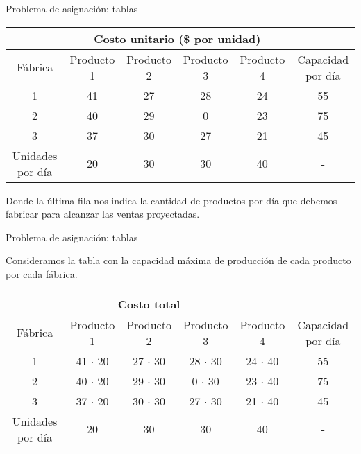 \documentclass{beamer}
\begin{document}
\begin{frame}[fragile]{Problema de asignación: tablas}
  \begin{center}
    \begin{adjustbox}{width = 1.05 \textwidth}
        \begin{tabular}{|c |c | c | c| c| c|}
          \hline
          & \multicolumn{4}{|c|}{ Costo unitario (\$ por unidad)}  &  \\
          \hline
          Fábrica & Producto 1 & Producto 2 & Producto 3 & Producto 4 &  Capacidad por día \\
          \hline 
          1 & 41 & 27 & 28 & 24 & 55 \\
          2 & 40 & 29 & 0 & 23  & 75 \\
          3 & 37 & 30 & 27 & 21 & 45 \\
          \hline 
          Unidades por día & 20 & 30 & 30 & 40 & - \\
          \hline
        \end{tabular}
    \end{adjustbox}
  \end{center}
  Donde la última fila nos indica la cantidad de productos por día que debemos fabricar para alcanzar las ventas proyectadas.
\end{frame}


\begin{frame}[fragile]{Problema de asignación: tablas}
  
  Consideramos la tabla con la capacidad máxima de producción de cada producto por cada fábrica.


  \begin{center}
    \begin{adjustbox}{width = 1.05 \textwidth}
        \begin{tabular}{|c |c | c | c| c| c|}
          \hline
          & \multicolumn{3}{|c|}{ Costo total} & &  \\
          \hline
          Fábrica & Producto 1 & Producto 2 & Producto 3 & Producto 4 &  Capacidad por día \\
          \hline 
          1 & 41 $\cdot$ \alert{20} & 27 $\cdot$ \alert{30} & 28 $\cdot$ \alert{30} & 24 $\cdot$ \alert{40}& 55 \\
          2 & 40 $\cdot$ \alert{20} & 29 $\cdot$ \alert{30} & 0 $\cdot$ \alert{30}  & 23 $\cdot$ \alert{40} & 75 \\
          3 & 37 $\cdot$ \alert{20} & 30 $\cdot$ \alert{30} & 27 $\cdot$ \alert{30} & 21 $\cdot$ \alert{40} & 45 \\
          \hline 
          Unidades por día & 20 & 30 & 30 & 40 & - \\
          \hline
        \end{tabular}
    \end{adjustbox}
  \end{center}
\end{frame}
\end{document}
